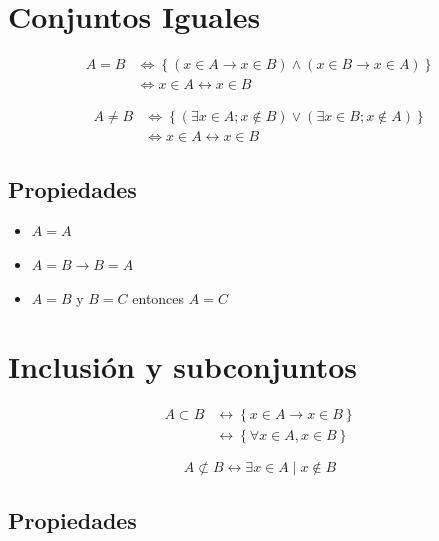 \documentclass[
  16pt,
]{krantz}
\providecommand{\tightlist}{%
  \setlength{\itemsep}{0pt}\setlength{\parskip}{0pt}}
\theoremstyle{definition}
\theoremstyle{definition}
\theoremstyle{definition}
\theoremstyle{definition}
\theoremstyle{remark}
\begin{document}
\hypertarget{conjuntos-iguales}{%
\section{Conjuntos Iguales}\label{conjuntos-iguales}}

\[\begin{aligned}A=B&\Longleftrightarrow \left\{(x\in A\rightarrow x\in B)\wedge(x\in B\rightarrow x\in A)\right\}\\
&\Longleftrightarrow x\in A \leftrightarrow x\in B
\end{aligned}\]

\[\begin{aligned}A\neq B&\Longleftrightarrow \left\{(\exists x\in A; x\notin B)\vee(\exists x\in B; x\notin A)\right\}\\
&\Longleftrightarrow x\in A \leftrightarrow x\in B
\end{aligned}\]

\hypertarget{propiedades}{%
\subsection{Propiedades}\label{propiedades}}

\begin{itemize}
\tightlist
\item
  \(A=A\)
\item
  \(A=B\rightarrow B=A\)
\item
  \(A=B\) y \(B=C\) entonces \(A=C\)
\end{itemize}

\hypertarget{inclusiuxf3n-y-subconjuntos}{%
\section{Inclusión y subconjuntos}\label{inclusiuxf3n-y-subconjuntos}}

\[
\begin{aligned}
A\subset B&\leftrightarrow\left\{x\in A\rightarrow x\in B\right\}\\
&\leftrightarrow\left\{\forall x\in A, x\in B\right\}
\end{aligned}
\]

\[
A\not\subset B\leftrightarrow\exists x\in A\;|\; x\notin B
\]

\hypertarget{propiedades-1}{%
\subsection{Propiedades}\label{propiedades-1}}
\end{document}
